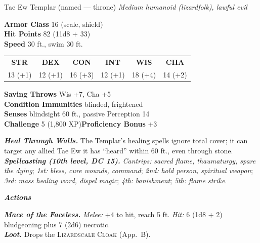 \documentclass[10pt,twoside]{article}
\newcommand{\abilities}[6]{%
\begin{center}\small
\setlength{\tabcolsep}{6pt}\renewcommand{\arraystretch}{1.05}
\begin{tabular}{cccccc}
\textbf{STR}&\textbf{DEX}&\textbf{CON}&\textbf{INT}&\textbf{WIS}&\textbf{CHA}\\[1pt]
#1&#2&#3&#4&#5&#6\\
\end{tabular}\end{center}}
\newcommand{\sbrule}{\par\vspace{2pt}\noindent{\color{bloodred}\rule{\linewidth}{1.1pt}}\par\vspace{2pt}}
\newcommand{\eqname}[1]{\textsc{#1}}
\begin{document}
\begin{statblock}{Tae Ew Templar \textnormal{(named --- throne)}}
\textit{Medium humanoid (lizardfolk), lawful evil}\sbrule
\textbf{Armor Class} 16 (scale, shield)\\
\textbf{Hit Points} 82 (11d8 + 33)\\
\textbf{Speed} 30 ft., swim 30 ft.\sbrule
\abilities{13 (+1)}{12 (+1)}{16 (+3)}{12 (+1)}{18 (+4)}{14 (+2)}
\sbrule
\textbf{Saving Throws} Wis +7, Cha +5\\
\textbf{Condition Immunities} blinded, frightened\\
\textbf{Senses} blindsight 60 ft., passive Perception 14\\
\textbf{Challenge} 5 (1,800 XP)\hfill\textbf{Proficiency Bonus} +3\sbrule
\textbf{\textit{Heal Through Walls.}} The Templar's healing spells ignore total cover;
it can target any allied Tae Ew it has ``heard'' within 60 ft., even through stone.\\
\textbf{\textit{Spellcasting (10th level, DC 15).}} \emph{Cantrips:} \textit{sacred
flame, thaumaturgy, spare the dying}; \emph{1st:} \textit{bless, cure wounds,
command}; \emph{2nd:} \textit{hold person, spiritual weapon}; \emph{3rd:} \textit{mass
healing word, dispel magic}; \emph{4th:} \textit{banishment}; \emph{5th:} \textit{flame
strike}.\sbrule
\textit{\textbf{Actions}}\par
\textbf{\textit{Mace of the Faceless.}} \textit{Melee:} +4 to hit, reach 5 ft.
\textit{Hit:} 6 (1d8 + 2) bludgeoning plus 7 (2d6) necrotic.\\
\textbf{\textit{Loot.}} Drops the \eqname{Lizardscale Cloak} (App.\ B).
\end{statblock}
\end{document}
